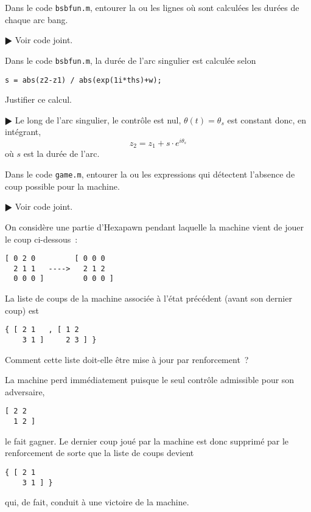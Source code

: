 \documentclass[11pt,a4paper]{article}
\theoremstyle{plain}
\theoremstyle{definition}
\begin{document}
\begin{Exercice}[6 points]

\begin{Question} Dans le code \verb+bsbfun.m+, entourer la ou les lignes
o\`u sont calcul\'ees les dur\'ees de chaque arc bang.
\end{Question}
\begin{corr} $\RHD$ Voir code joint.
\end{corr}

\begin{Question} Dans le code \verb+bsbfun.m+, la dur\'ee de l'arc singulier est
calcul\'ee selon
\begin{verbatim}
s = abs(z2-z1) / abs(exp(1i*ths)+w);
\end{verbatim}
Justifier ce calcul.
\end{Question}
\begin{corr} $\RHD$ Le long de l'arc singulier, le contr\^ole est nul,
$\theta(t)=\theta_s$ est constant donc, en int\'egrant,
\[ z_2=z_1+s\cdot e^{i\theta_s} \]
o\`u $s$ est la dur\'ee de l'arc.
\end{corr}

\begin{Question} Dans le code \verb+game.m+, entourer la ou les expressions qui
d\'etectent l'absence de coup possible pour la machine.
\end{Question}
\begin{corr} $\RHD$ Voir code joint.
\end{corr}

\begin{Question} On consid\`ere une partie d'Hexapawn pendant laquelle la machine
vient de jouer le coup ci-dessous~:
\begin{verbatim}
[ 0 2 0         [ 0 0 0 
  2 1 1   ---->   2 1 2
  0 0 0 ]         0 0 0 ]
\end{verbatim}
La liste de coups de la machine associ\'ee \`a l'\'etat pr\'ec\'edent (avant son
dernier coup) est 
\begin{verbatim}
{ [ 2 1   , [ 1 2
    3 1 ]     2 3 ] }
\end{verbatim}
Comment cette liste doit-elle \^etre mise \`a jour par renforcement~?
\end{Question}
\begin{corr} La machine perd imm\'ediatement puisque le seul contr\^ole admissible
pour son adversaire, 
\begin{verbatim}
[ 2 2
  1 2 ]
\end{verbatim}
le fait gagner. Le dernier coup jou\'e par la machine est donc supprim\'e par le
renforcement de sorte que la liste de coups devient
\begin{verbatim}
{ [ 2 1
    3 1 ] }
\end{verbatim}
qui, de fait, conduit \`a une victoire de la machine.
\end{corr}

\end{Exercice}
\end{document}

